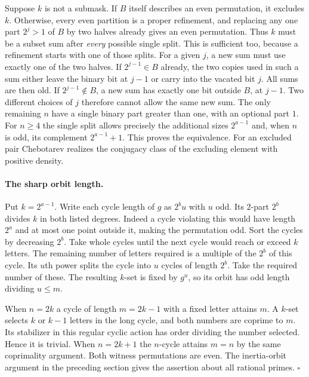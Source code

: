 Suppose $k$ is not a submask. If $B$ itself describes an even permutation,
it excludes $k$. Otherwise, every even partition is a proper refinement,
and replacing any one part $2^j>1$ of $B$ by two halves already gives an
even permutation. Thus $k$ must be a subset sum after \emph{every}
possible single split. This is sufficient too, because a refinement starts
with one of those splits. For a given $j$, a new sum must use exactly one
of the two halves. If $2^{j-1}\in B$ already, the two copies used in such
a sum either leave the binary bit at $j-1$ or carry into the vacated
bit $j$. All sums are then old. If $2^{j-1}\notin B$, a new sum has
exactly one bit outside $B$, at $j-1$. Two different choices of $j$
therefore cannot allow the same new sum. The only remaining $n$ have
a single binary part greater than one, with an optional part $1$.
For $n\ge4$ the single split allows precisely the additional sizes
$2^{a-1}$ and, when $n$ is odd, its complement $2^{a-1}+1$.
This proves the equivalence. For an excluded pair Chebotarev realizes
the conjugacy class of the excluding element with positive density.

\paragraph{The sharp orbit length.}
Put $k=2^{a-1}$. Write each cycle length of $g$ as $2^bu$ with $u$ odd.
Its $2$-part $2^b$ divides $k$ in both listed degrees. Indeed a cycle
violating this would have length $2^a$ and at most one point outside it,
making the permutation odd. Sort the cycles by decreasing $2^b$. Take
whole cycles until the next cycle would reach or exceed $k$ letters.
The remaining number of letters required is a multiple of the $2^b$ of
this cycle. Its $u$th power splits the cycle into $u$ cycles of length
$2^b$. Take the required number of these. The resulting $k$-set is fixed
by $g^u$, so its orbit has odd length dividing $u\le m$.

When $n=2k$ a cycle of length $m=2k-1$ with a fixed letter attains $m$.
A $k$-set selects $k$ or $k-1$ letters in the long cycle, and both
numbers are coprime to $m$. Its stabilizer in this regular cyclic action
has order dividing the number selected. Hence it is trivial. When
$n=2k+1$ the $n$-cycle attains $m=n$ by the same coprimality argument.
Both witness permutations are even. The inertia-orbit argument in the
preceding section gives the assertion about all rational primes.
\hfill$\square$

